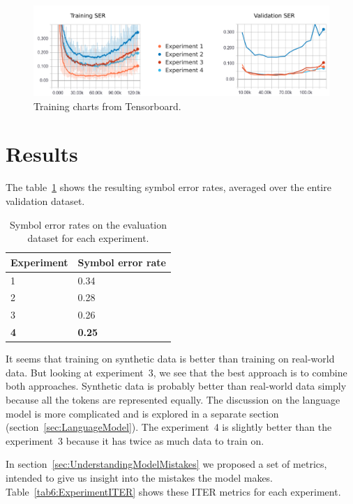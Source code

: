 \begin{figure}[h]
    \centering
    \includegraphics[width=140mm]{../img/training-charts}
    \caption{Training charts from Tensorboard.}
    \label{fig6:TrainingCharts}
\end{figure}


\section{Results}
\label{sec:Results}

The table~\ref{tab6:ExperimentSER} shows the resulting symbol error rates, averaged over the entire validation dataset.

\begin{table}[h] \centering
\begin{tabular}{ll}
\toprule
\textbf{Experiment} & \textbf{Symbol error rate} \\
\midrule
1 & 0.34 \\
2 & 0.28 \\
3 & 0.26 \\
\textbf{4} & \textbf{0.25} \\
\bottomrule
\end{tabular}
\caption{Symbol error rates on the evaluation dataset for each experiment.}
\label{tab6:ExperimentSER}
\end{table}

It seems that training on synthetic data is better than training on real-world data. But looking at experiment~3, we see that the best approach is to combine both approaches. Synthetic data is probably better than real-world data simply because all the tokens are represented equally. The discussion on the language model is more complicated and is explored in a separate section (section~\ref{sec:LanguageModel}). The experiment~4 is slightly better than the experiment~3 because it has twice as much data to train on.

In section~\ref{sec:UnderstandingModelMistakes} we proposed a set of metrics, intended to give us insight into the mistakes the model makes. Table~\ref{tab6:ExperimentITER} shows these ITER metrics for each experiment.

